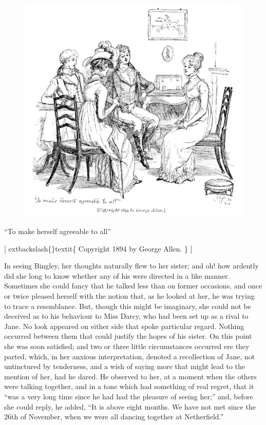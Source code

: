 \documentclass[10pt]{book}
\begin{document}
\begin{figure}[h]
\centering
\includegraphics[width=\linewidth]{images/i_350.jpg}
\end{figure}

      “To make herself agreeable to all”
     

     [
     	extbackslash\{\}textit\{
      Copyright 1894 by George Allen.
     \}
     ]
    

   In seeing Bingley, her thoughts naturally flew to her sister; and oh!
how ardently did she long to know whether any of his were directed in a
like manner. Sometimes she could fancy that he talked less than on
former occasions, and once or twice pleased herself with the notion
that, as he looked at her, he was trying to trace a resemblance. But,
though this might be imaginary, she could not be deceived as to his
behaviour
   to Miss Darcy, who had been set up as a rival to Jane. No
look appeared on either side that spoke particular regard. Nothing
occurred between them that could justify the hopes of his sister. On
this point she was soon satisfied; and two or three little circumstances
occurred ere they parted, which, in her anxious interpretation, denoted
a recollection of Jane, not untinctured by tenderness, and a wish of
saying more that might lead to the mention of her, had he dared. He
observed to her, at a moment when the others were talking together, and
in a tone which had something of real regret, that it “was a very long
time since he had had the pleasure of seeing her;” and, before she could
reply, he added, “It is above eight months. We have not met since the
26th of November, when we were all dancing together at Netherfield.”
  
\end{document}
